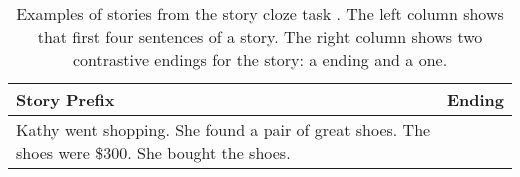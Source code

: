 \documentclass[11pt]{article}
\begin{document}
\begin{table}[!t]
\begin{tabular}{|p{3.5cm}|p{3.5cm}|} \hline
{\bf Story Prefix} & {\bf Ending} \\ \hline
\multirow{2}{*}{\parbox[b][7.5em][c]{3.5cm}{Kathy went shopping. She found a pair of great shoes. The shoes were \$300. She bought the shoes.}}	&{\color{forestgreen}{She felt buyer's remorse after the purchase.}} \\ \cline{2-2}
& {\color{red}{Kathy hated buying shoes.}} \\ \hline
\end{tabular}
\caption{\label{ROC-example}
Examples of stories from the story cloze task \cite{Mostafazadeh:2016}. 
The left column shows that first four sentences of a story. 
The right column shows two contrastive endings for the story:
 a {\color{forestgreen}{coherent}} ending and a {\color{red}{incoherent}} one.
}
\end{table}
\end{document}
